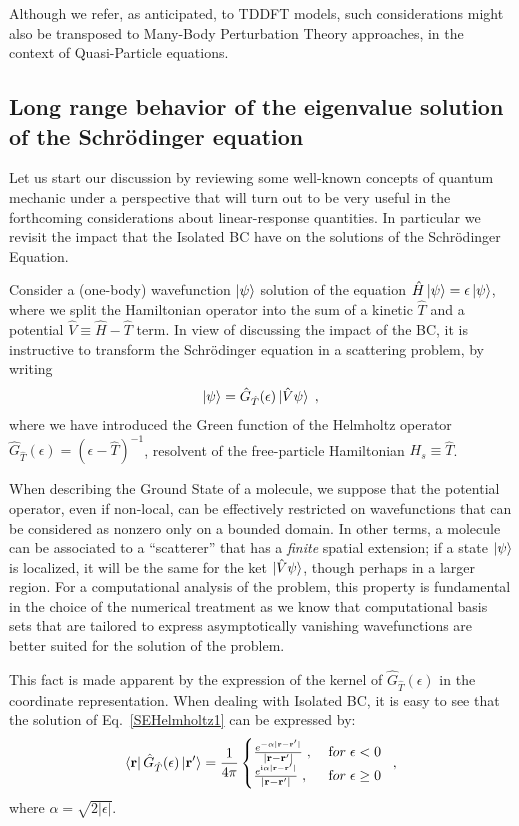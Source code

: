 \documentclass[reprint,aps,prb]{revtex4-1}
\renewcommand{\r}{{\bf r}}
\newcommand{\eps}{\epsilon}
\newcommand{\ii}{\mathrm{i}}
\newcommand{\be}{\begin{equation}}
\newcommand{\ee}{\end{equation}}
\newcommand{\lb}{\label}
\newcommand{\op}[1]{\hat {#1}}
\newcommand{\GH}{\op G_{\op T}}
\begin{document}
Although we refer, as anticipated, to TDDFT models, such considerations might also be transposed to Many-Body Perturbation Theory
approaches, in the context of Quasi-Particle equations.

\subsection{Long range behavior of the eigenvalue solution of the Schr\"odinger equation}
\label{SEopenSystem}

Let us start our discussion by reviewing some well-known concepts of quantum mechanic under a perspective that will turn out to be very useful 
in the forthcoming considerations about linear-response quantities. In particular we revisit the impact that the Isolated BC have on the solutions 
of the Schr\"odinger Equation.

Consider a (one-body) wavefunction $\ket{\psi}$ solution of the equation
$\op H\ket{\psi}=\eps\ket{\psi}$, where we split the Hamiltonian operator into the sum of
a kinetic $\op T$ and a potential $\op V \equiv \op H - \op T$ term.
In view of discussing the impact of the BC, it is instructive to transform
the Schr\"odinger equation in a scattering problem, by writing
\be\lb{SEHelmholtz1}
\ket{\psi} = \GH(\eps)\ket{\op V\psi}\;,
\ee
where we have introduced the Green function of the Helmholtz operator $\GH(\eps) = (\eps-\op T)^{-1}$,
resolvent of the free-particle Hamiltonian $H_s \equiv \op T$.

When describing the Ground State of a molecule, we suppose that the potential operator, even if non-local,
can be effectively restricted on wavefunctions that can be considered as nonzero only on a
bounded domain. In other terms, a molecule can be associated to a ``scatterer'' that has a \emph{finite}
spatial extension; if a state $\ket{\psi}$ is localized, it will be the same for the ket $\ket{\op V \psi}$, though
perhaps in a larger region.
For a computational analysis of the problem, this property is fundamental in the choice of the numerical treatment as we know that
computational basis sets
that are tailored to express asymptotically vanishing wavefunctions are better suited for the solution of the problem.

This fact is made apparent by the expression of
the kernel of $\GH(\eps)$ in the coordinate representation.
When dealing with Isolated BC, it is easy to see that the solution of Eq.~\eqref{SEHelmholtz1}
can be expressed by:
\be\lb{HelmholtzKernelDef1}
\bra{\r} \GH(\eps) \ket{\r'} = \frac{1}{4\pi} \begin{cases}
\frac{e^{-\alpha|\r - \r' |}}{|\r- \r' |} \;,\; & {\textrm for}\; \eps  < 0\; \\
\frac{e^{\ii \alpha |\r-\r' |}}{|\r-\r' |} \;, & {\textrm for} \; \eps \geq 0
\end{cases} \;,
\ee
where $\alpha = \sqrt{2|\eps|}$.
\end{document}
